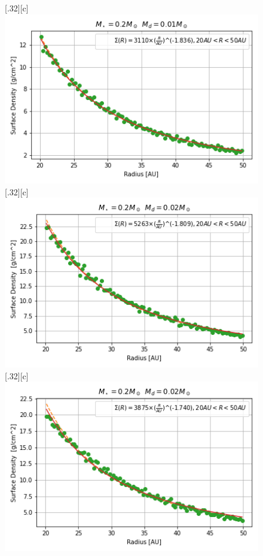 \documentclass[aps,prb,twocolumn,superscriptaddress,floatfix,longbibliography]{revtex4-2}
\begin{document}
\begin{appendices}
\begin{figure}[!htbp]
  \subcaptionbox*{}[.32\linewidth][c]{%
    \includegraphics[width=\linewidth]{Graphs_1D/r_0.2s_0.01d_0.7q_1D.png}}\quad
  \subcaptionbox*{}[.32\linewidth][c]{%
     \includegraphics[width=\linewidth]{Graphs_1D/r_0.2s_0.02d_0.3q_1D.png}}\quad
     \vspace{-2\baselineskip}
  \subcaptionbox*{}[.32\linewidth][c]{%
    \includegraphics[width=\linewidth]{Graphs_1D/r_0.2s_0.02d_0.5q_1D.png}}\quad

\end{figure}
\end{appendices}
\end{document}
